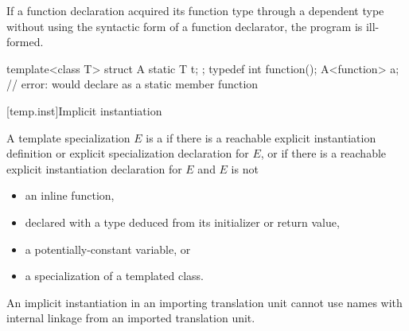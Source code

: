 \pnum
If a function declaration acquired its function type through
a dependent type without using the syntactic form of
a function declarator, the program is ill-formed.
\begin{example}
\begin{codeblock}
template<class T> struct A {
  static T t;
};
typedef int function();
A<function> a;      // error: would declare  as a static member function
\end{codeblock}
\end{example}

[temp.inst]{Implicit instantiation}

\pnum
A template specialization $E$ is a 
if there is a reachable
explicit instantiation definition or
explicit specialization declaration
for $E$, or
if there is a reachable explicit instantiation declaration for $E$ and
$E$ is not
\begin{itemize}
\item
an inline function,
\item
declared with a type deduced
from its initializer or return value,
\item
a potentially-constant variable, or
\item
a specialization of a templated class.
\end{itemize}
\begin{note}
An implicit instantiation in an importing translation unit
cannot use names with internal linkage
from an imported translation unit.
\end{note}


